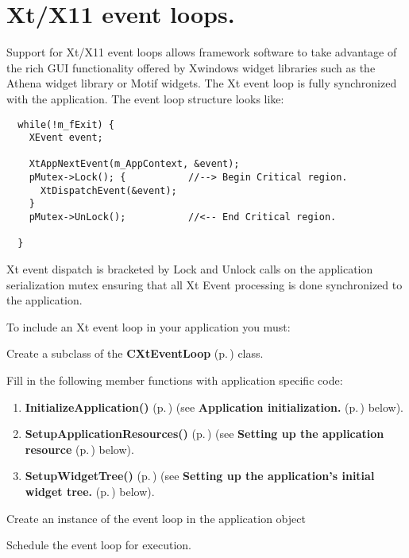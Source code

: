 \section{Xt/X11 event loops.}\label{XtGuests}


Support for Xt/X11 event loops allows framework software to take advantage of the rich GUI functionality offered by Xwindows widget libraries such as the Athena widget library or Motif widgets. The Xt event loop is fully  synchronized with the application. The event loop structure looks like:



\footnotesize\begin{verbatim}  while(!m_fExit) {
    XEvent event;

    XtAppNextEvent(m_AppContext, &event);
    pMutex->Lock(); {           //--> Begin Critical region.
      XtDispatchEvent(&event);
    }
    pMutex->UnLock();           //<-- End Critical region.

  }
\end{verbatim}\normalsize 


Xt event dispatch is bracketed by Lock and Unlock calls on the application  serialization mutex ensuring that all Xt Event processing is done synchronized to the application.

To include an Xt event loop in your application you must:\begin{CompactItemize}
\item 
Create a subclass of the {\bf CXt\-Event\-Loop} {\rm (p.\,\pageref{classCXtEventLoop})} class.\item 
Fill in the following member functions with application specific code:\begin{enumerate}
\item 
{\bf Initialize\-Application()} {\rm (p.\,\pageref{classCXtEventLoop_b6})} (see {\bf Application initialization.} {\rm (p.\,\pageref{InitializeApplication})} below).\item 
{\bf Setup\-Application\-Resources()} {\rm (p.\,\pageref{classCXtEventLoop_b7})} (see  {\bf Setting up the application resource} {\rm (p.\,\pageref{SetupApplicationResources})} below).\item 
{\bf Setup\-Widget\-Tree()} {\rm (p.\,\pageref{classCXtEventLoop_b8})} (see {\bf Setting up the application's initial widget tree.} {\rm (p.\,\pageref{SetupWidgetTree})} below).\end{enumerate}
\item 
Create an instance of the event loop in the application object\item 
Schedule the event loop for execution.\end{CompactItemize}
